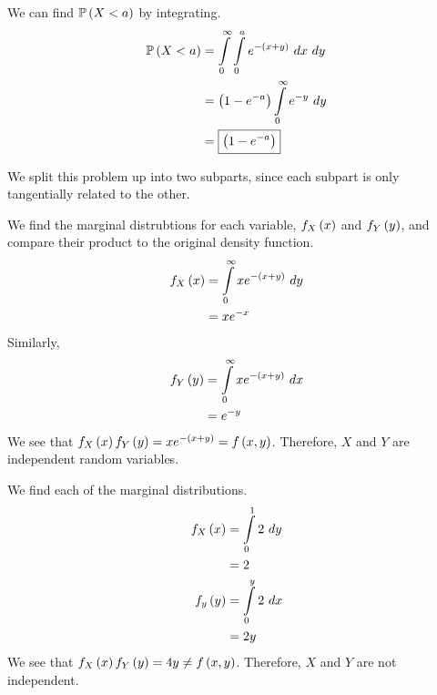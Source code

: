 \documentclass{article}
\begin{document}
\subproblema{}
We can find $\mathbb{P} \left ( X < a \right)$ by integrating.
\begin{align*}
  \PP{X < a} &= \int \limits_{0}^{\infty} \int \limits_{0}^{a} e^{- \pars{x+y}}\ dx\ dy \\
             &= \pars{1 - e^{-a}} \int \limits_{0}^{\infty} e^{-y}\ dy \\
             &= \boxed{\pars{1 - e^{-a}}} \\
\end{align*}

\setcounter{problem}{19}
\problem{}
We split this problem up into two subparts,
since each subpart is only tangentially related to the other.

\subproblema{}
We find the marginal distrubtions for each variable,
$f_X \left (x \right)$ and $f_Y \left (y \right)$,
and compare their product to the original density function.
\begin{align*}
  f_X \left (x \right) &= \int \limits_{0}^{\infty} x e^{- \left (x+y \right)}\ dy \\
               &= x e^{-x} \\
\end{align*}
Similarly,
\begin{align*}
  f_Y \left (y \right) &= \int \limits_{0}^{\infty} x e^{- \left (x+y \right)}\ dx \\
               &= e^{-y} \\
\end{align*}
We see that $f_X \left (x \right) f_Y \left (y \right) = x e^{- \left (x+y \right)} = f \left (x, y \right)$.
Therefore,
$X$ and $Y$ are independent random variables.

\subproblema{}
We find each of the marginal distributions.
\begin{align*}
  f_X \left (x \right) &= \int \limits_{0}^{1} 2\ dy \\
               &= 2 \\
  f_y \left (y \right) &= \int \limits_{0}^{y} 2\ dx \\
               &= 2y \\
\end{align*}
We see that $f_X \left (x \right) f_Y \left (y \right) = 4y \neq f \left (x, y \right)$.
Therefore, $X$ and $Y$ are not independent.
\end{document}
